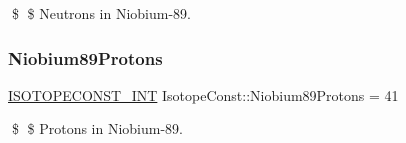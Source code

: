 \$ \$ Neutrons in Niobium-\/89. \mbox{\label{group___isotope_const-_niobium-_nb89_gaee4fa503a8ae88ec52cb931d30a77fe1}} 
\subsubsection{\texorpdfstring{Niobium89\+Protons}{Niobium89Protons}}
{\footnotesize\ttfamily \mbox{\hyperlink{group___isotope_const-_macros_ga5f18360b3e99483a35c32d789e62621c}{I\+S\+O\+T\+O\+P\+E\+C\+O\+N\+S\+T\+\_\+\+I\+NT}} Isotope\+Const\+::\+Niobium89\+Protons = 41}

\$ \$ Protons in Niobium-\/89. 